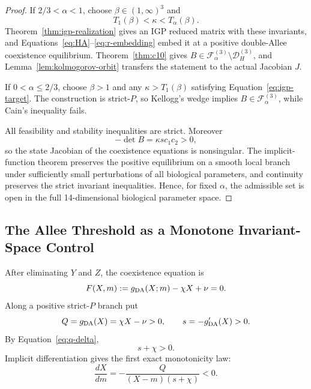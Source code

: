 \begin{proof}
If \(2/3<\alpha<1\), choose \(\beta\in(1,\infty)^3\) and
\[
 T_1(\beta)<\kappa<T_\alpha(\beta).
\]
Theorem~\ref{thm:igp-realization} gives an IGP reduced matrix with these invariants, and Equations~\eqref{eq:HA}--\eqref{eq:r-embedding} embed it at a positive double-Allee coexistence equilibrium. Theorem~\ref{thm:c10} gives \(B\in\mathcal F_\alpha^{(3)}\setminus\mathcal D_H^{(3)}\), and Lemma~\ref{lem:kolmogorov-orbit} transfers the statement to the actual Jacobian \(J\).

If \(0<\alpha\le2/3\), choose \(\beta>1\) and any \(\kappa>T_1(\beta)\) satisfying Equation~\eqref{eq:igp-target}. The construction is strict-\(P\), so Kellogg's wedge implies \(B\in\mathcal F_\alpha^{(3)}\), while Cain's inequality fails.

All feasibility and stability inequalities are strict. Moreover
\[
 -\det B=\kappa sc_1c_2>0,
\]
so the state Jacobian of the coexistence equations is nonsingular. The implicit-function theorem preserves the positive equilibrium on a smooth local branch under sufficiently small perturbations of all biological parameters, and continuity preserves the strict invariant inequalities. Hence, for fixed \(\alpha\), the admissible set is open in the full 14-dimensional biological parameter space.
\end{proof}

\subsection{The Allee Threshold as a Monotone Invariant-Space Control}

After eliminating \(Y\) and \(Z\), the coexistence equation is
\begin{equation}
 F(X,m)
 :=
 g_{\rm DA}(X;m)-\chi X+\nu=0.
 \label{eq:scalar-equilibrium}
\end{equation}
Along a positive strict-\(P\) branch put
\[
 Q=g_{\rm DA}(X)=\chi X-\nu>0,
 \qquad
 s=-g_{\rm DA}'(X)>0.
\]
By Equation~\eqref{eq:q-delta},
\[
 s+\chi>0.
\]
Implicit differentiation gives the first exact monotonicity law:
\begin{equation}
 \frac{dX}{dm}
 =
 -\frac{Q}{(X-m)(s+\chi)}
 <0.
 \label{eq:dXdm}
\end{equation}


